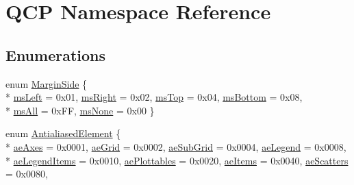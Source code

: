 \hypertarget{namespace_q_c_p}{}\section{Q\+C\+P Namespace Reference}
\label{namespace_q_c_p}
\subsection*{Enumerations}
\begin{DoxyCompactItemize}
\item 
enum \hyperlink{namespace_q_c_p_a7e487e3e2ccb62ab7771065bab7cae54}{Margin\+Side} \{ \\*
\hyperlink{namespace_q_c_p_a7e487e3e2ccb62ab7771065bab7cae54a9500c8bfcc9e80b9dff0a8e00e867f07}{ms\+Left} = 0x01, 
\hyperlink{namespace_q_c_p_a7e487e3e2ccb62ab7771065bab7cae54a93c719593bb2b94ed244d52c86d83b65}{ms\+Right} = 0x02, 
\hyperlink{namespace_q_c_p_a7e487e3e2ccb62ab7771065bab7cae54a5db8fb0d0b0ecf0d611c2602a348e8a0}{ms\+Top} = 0x04, 
\hyperlink{namespace_q_c_p_a7e487e3e2ccb62ab7771065bab7cae54a5241d8eac2bab9524a38889f576179cc}{ms\+Bottom} = 0x08, 
\\*
\hyperlink{namespace_q_c_p_a7e487e3e2ccb62ab7771065bab7cae54a43d7361cb0c5244eabdc962021bffebc}{ms\+All} = 0x\+F\+F, 
\hyperlink{namespace_q_c_p_a7e487e3e2ccb62ab7771065bab7cae54a80aa4149f16dabd538f8b2e3d42c42d5}{ms\+None} = 0x00
 \}
\item 
enum \hyperlink{namespace_q_c_p_ae55dbe315d41fe80f29ba88100843a0c}{Antialiased\+Element} \{ \\*
\hyperlink{namespace_q_c_p_ae55dbe315d41fe80f29ba88100843a0caefa92e89cd37f8a081fd2075aa1af73f}{ae\+Axes} = 0x0001, 
\hyperlink{namespace_q_c_p_ae55dbe315d41fe80f29ba88100843a0ca4fbb37118d62288af0ca601ff2b07a2f}{ae\+Grid} = 0x0002, 
\hyperlink{namespace_q_c_p_ae55dbe315d41fe80f29ba88100843a0caaedf83369188a15a69f92bb1d85ca97b}{ae\+Sub\+Grid} = 0x0004, 
\hyperlink{namespace_q_c_p_ae55dbe315d41fe80f29ba88100843a0ca9e0127a6361b5d0596b031a482c5cf97}{ae\+Legend} = 0x0008, 
\\*
\hyperlink{namespace_q_c_p_ae55dbe315d41fe80f29ba88100843a0ca1aca7a50c1b95403958733a4acafe773}{ae\+Legend\+Items} = 0x0010, 
\hyperlink{namespace_q_c_p_ae55dbe315d41fe80f29ba88100843a0ca4145e4251b0cf2dbedabeea0a38f84f6}{ae\+Plottables} = 0x0020, 
\hyperlink{namespace_q_c_p_ae55dbe315d41fe80f29ba88100843a0caf7712a85d6b0c75b24301d2fe9484db3}{ae\+Items} = 0x0040, 
\hyperlink{namespace_q_c_p_ae55dbe315d41fe80f29ba88100843a0cae45ed8cd167bffe27d7f40da4bc17e9c}{ae\+Scatters} = 0x0080, 

\end{DoxyCompactItemize}
